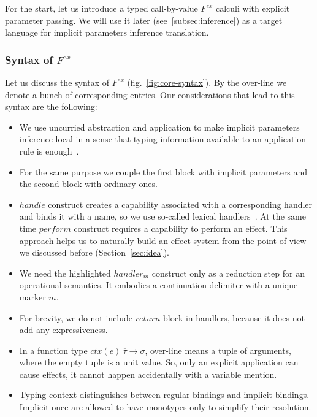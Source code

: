 \documentclass[acmsmall]{acmart}
\newcommand{\ctx}[1]{ctx(#1)~}
\begin{document}
For the start, let us introduce a typed call-by-value $F^{ex}$ calculi with explicit parameter passing.
We will use it later (see\ \ref{subsec:inference}) as a target language for implicit parameters inference translation.

\subsubsection{Syntax of $F^{ex}$}

Let us discuss the syntax of $F^{ex}$ (fig.~\ref{fig:core-syntax}).
By the over-line we denote a bunch of corresponding entries.
Our considerations that lead to this syntax are the following:
\begin{itemize}
    \item We use uncurried abstraction and application to make implicit parameters inference local in a sense that typing information available to an application rule is enough~\cite{pierce2000local}.
    \item For the same purpose we couple the first block with implicit parameters and the second block with ordinary ones.
    \item $handle$ construct creates a capability associated with a corresponding handler and binds it with a name, so we use so-called lexical handlers~\cite{biernacki2019binders}. %
    At the same time $perform$ construct requires a capability to perform an effect.
    This approach helps us to naturally build an effect system from the point of view we discussed before (Section~\ref{sec:idea}).
    \item We need the highlighted $handler_m$ construct only as a reduction step for an operational semantics.
    It embodies a continuation delimiter with a unique marker $m$.
    \item For brevity, we do not include $return$ block in handlers, because it does not add any expressiveness.
    \item In a function type $\ctx{e} \overline{\tau} \to \sigma$, over-line means a tuple of arguments, where the empty tuple is a unit value.
    So, only an explicit application can cause effects, it cannot happen accidentally with a variable mention.
    \item Typing context distinguishes between regular bindings and implicit bindings.
    Implicit once are allowed to have monotypes only to simplify their resolution.
\end{itemize}
\end{document}
